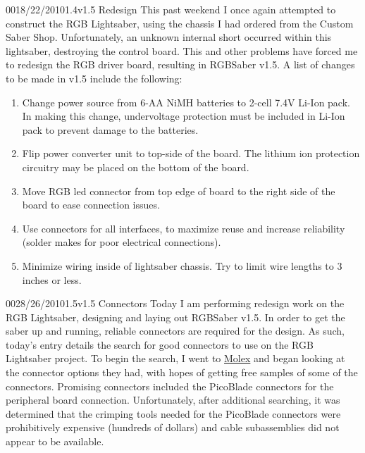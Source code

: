 \documentclass[12pt,letterpaper,onecolumn]{article}
\newcommand{\documentationtype}{Project Notebook}
\newcommand{\projectname}{RGBSaber }
\newcommand{\projectversion}{1}
\begin{document}
\thispagestyle{plain}
\nbwheader{\documentationtype}{\projectname}{\projectversion}

\begin{nbentry}{001}{8/22/2010}{1.4}{v1.5 Redesign}
	This past weekend I once again attempted to construct the RGB Lightsaber, using the chassis I had ordered from the Custom Saber Shop. Unfortunately, an unknown internal short occurred within this lightsaber, destroying the control board. This and other problems have forced me to redesign the RGB driver board, resulting in RGBSaber v1.5. A list of changes to be made in v1.5 include the following:
\begin{enumerate}
\item Change power source from 6-AA NiMH batteries to 2-cell 7.4V Li-Ion pack. In making this change, undervoltage protection must be included in Li-Ion pack to prevent damage to the batteries.
\item Flip power converter unit to top-side of the board. The lithium ion protection circuitry may be placed on the bottom of the board.
\item Move RGB led connector from top edge of board to the right side of the board to ease connection issues.
\item Use connectors for all interfaces, to maximize reuse and increase reliability (solder makes for poor electrical connections).
\item Minimize wiring inside of lightsaber chassis. Try to limit wire lengths to 3 inches or less.
\end{enumerate}
\end{nbentry}

\begin{nbentry}{002}{8/26/2010}{1.5}{v1.5 Connectors}
	Today I am performing redesign work on the RGB Lightsaber, designing and laying out RGBSaber v1.5. In order to get the saber up and running, reliable connectors are required for the design. As such, today's entry details the search for good connectors to use on the RGB Lightsaber project.
	To begin the search, I went to \href{http://www.molex.com/}{Molex} and began looking at the connector options they had, with hopes of getting free samples of some of the connectors. Promising connectors included the PicoBlade connectors for the peripheral board connection. Unfortunately, after additional searching, it was determined that the crimping tools needed for the PicoBlade connectors were prohibitively expensive (hundreds of dollars) and cable subassemblies did not appear to be available.
\end{nbentry}
\end{document}
